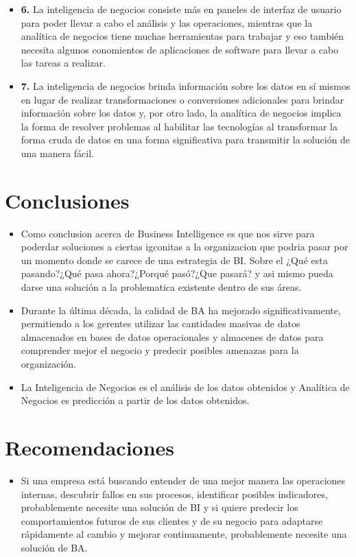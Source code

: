\documentclass[preprint,12pt]{elsarticle}
\begin{document}
\begin{itemize}
	\item{\textbf{6.}} La inteligencia de negocios consiste más en paneles de interfaz de usuario para poder llevar a cabo el análisis 		y las operaciones, mientras que la analítica de negocios tiene muchas herramientas para trabajar y eso también necesita algunos 		conomientos de aplicaciones de software para llevar a cabo las tareas a realizar.
	\item{\textbf{7.}} La inteligencia de negocios brinda información sobre los datos en sí mismos en lugar de realizar 				transformaciones o conversiones adicionales para brindar información sobre los datos y, por otro lado, la analítica de negocios 			implica la forma de resolver problemas al habilitar las tecnologías al transformar la forma cruda de datos en una forma significativa 	para transmitir la solución de una manera fácil.
	\end{itemize}


\section{Conclusiones}

	\begin{itemize}
\item Como conclusion acerca de Business Intelligence es que nos sirve para poderdar soluciones a ciertas igconitas a la organizacion que 
podria pasar por un momento donde se carece de una estrategia de BI.
Sobre el ¿Qué esta pasando?¿Qué pasa ahora?¿Porqué pasó?¿Que pasará? y asi mismo pueda darse una solución a la problematica 
existente dentro de sus áreas.
\item Durante la última década, la calidad de BA ha mejorado significativamente, permitiendo a los gerentes utilizar las cantidades masivas de datos almacenados en bases de datos operacionales y almacenes de datos para comprender mejor el negocio y predecir posibles amenazas para la organización.
\item La Inteligencia de Negocios es el análisis de los datos obtenidos y Analítica de Negocios es predicción a partir de los datos obtenidos. 
	\end{itemize}



\section{Recomendaciones}	
	\begin{itemize}

	\item Si una empresa está buscando entender de una mejor manera las operaciones internas, descubrir fallos en sus procesos, identificar posibles indicadores, probablemente necesite una solución de BI y si quiere predecir los comportamientos futuros de sus clientes y de su negocio para adaptarse rápidamente al cambio y mejorar continuamente, probablemente necesite una solución de BA.
	\end{itemize}
\end{document}

